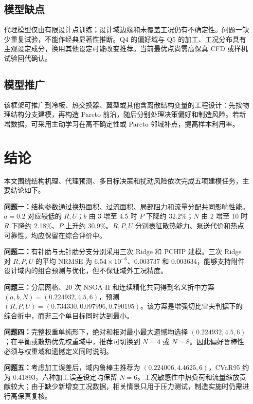 \documentclass[12pt,a4paper]{article}
\begin{document}
\subsection{模型缺点}
代理模型仅由有限设计点训练；设计域边缘和未覆盖工况仍有不确定性。问题一缺少重复试验，不能作经典显著性推断。Q4 的偏好域与 Q5 的加工、工况分布具有主观设定成分，换用其他设定可能改变推荐。当前最优点尚需高保真 CFD 或样机试验回代确认。

\subsection{模型推广}
该框架可推广到冷板、热交换器、翼型或其他含离散结构变量的工程设计：先按物理结构分支建模，再构造 Pareto 前沿，随后分别处理决策偏好和制造风险。若新增数据，可采用主动学习在高不确定性或 Pareto 邻域补点，提高样本利用率。

\section{结论}
本文围绕结构机理、代理预测、多目标决策和扰动风险依次完成五项建模任务，主要结论如下。

\textbf{问题一：}结构参数通过换热面积、过流面积、局部阻力和流量分配共同影响性能。$a=0.2$ 对应较低的 $R,U$；$b$ 由 3 增至 4.5 时 $P$ 下降约 32.2\%；$N$ 由 2 增至 10 时 $R$ 下降约 2.18\%、$P$ 上升约 30.9\%。$R,P,U$ 分别表征散热能力、泵送代价和热点可靠性，均应保留在综合评价中。

\textbf{问题二：}有针肋与无针肋分支分别采用三次 Ridge 和 PCHIP 建模。三次 Ridge 对 $R,P,U$ 的平均 NRMSE 为 $6.54\times10^{-6}$、0.003737 和 0.003634，能够支持附件设计域内的组合预测与优化，但不保证域外工况精度。

\textbf{问题三：}分层网格、20 次 NSGA-II 和连续精化共同得到名义折中方案 $(a,b,N)=(0.224932,4.5,6)$，预测 $(R,P,U)=(0.734330,0.097996,0.790195)$。该方案是增强切比雪夫判据下的综合折中，而非三个单目标同时达到最小。

\textbf{问题四：}完整权重单纯形下，绝对和相对最小最大遗憾均选择 $(0.224932,4.5,6)$；在平衡或散热优先权重域中，推荐可切换到 $N=4$ 或 $N=8$。因此偏好鲁棒性必须与权重域和遗憾定义同时说明。

\textbf{问题五：}考虑加工误差后，域内鲁棒主推荐为 $(0.224006,4.4625,6)$，CVaR95 约为 0.41893，六种加工误差设定均保留 $N=6$。工况敏感性中热负荷和流量缩放贡献较大；由于缺少新增变工况数据，相关情景只用于压力测试，制造实施时仍需进行高保真复核。
\end{document}
